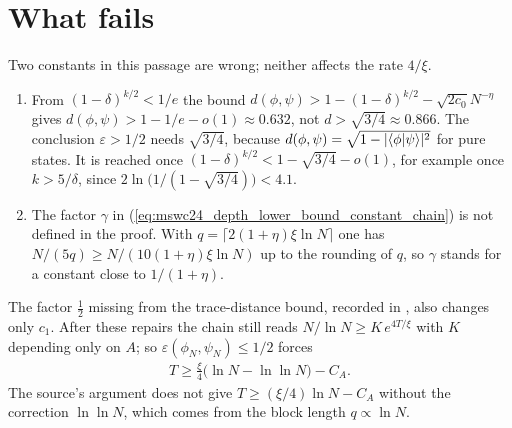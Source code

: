 \documentclass{article}
\begin{document}
\section{What fails}
Two constants in this passage are wrong; neither affects the rate $4/\xi$.
\begin{enumerate}
    \item From $(1-\delta)^{k/2}<1/e$ the bound
          $d(\phi,\psi)>1-(1-\delta)^{k/2}-\sqrt{2c_0}N^{-\eta}$ gives
          $d(\phi,\psi)>1-1/e-o(1)\approx0.632$, not $d>\sqrt{3/4}\approx0.866$.
          The conclusion $\varepsilon>1/2$ needs $\sqrt{3/4}$, because
          $d(\phi,\psi)=\sqrt{1-\lvert\langle \phi | \psi \rangle\rvert^2}$ for pure
          states. It is reached once $(1-\delta)^{k/2}<1-\sqrt{3/4}-o(1)$, for
          example once $k>5/\delta$, since
          $2\ln\bigl(1/(1-\sqrt{3/4})\bigr)<4.1$.
    \item The factor $\gamma$ in
          (\ref{eq:mswc24_depth_lower_bound_constant_chain}) is not defined in
          the proof. With $q=\lceil2(1+\eta)\xi\ln N\rceil$ one has
          $N/(5q)\ge N/(10(1+\eta)\xi\ln N)$ up to the rounding of $q$, so
          $\gamma$ stands for a constant close to $1/(1+\eta)$.
\end{enumerate}
The factor $\tfrac12$ missing from the trace-distance bound, recorded
in
, also changes
only $c_1$. After these repairs the chain still reads
$N/\ln N\ge K\,e^{4T/\xi}$ with $K$ depending only on $A$; so
$\varepsilon(\phi_N,\psi_N)\le1/2$ forces
\begin{align}
    T\ge\frac\xi4\bigl(\ln N-\ln\ln N\bigr)-C_A .
    \label{eq:mswc24_depth_lower_bound_constant_source}
\end{align}
The source's argument does not give $T\ge(\xi/4)\ln N-C_A$ without the
correction $\ln\ln N$, which comes from the block length $q\propto\ln N$.
\end{document}
